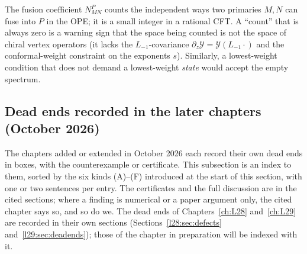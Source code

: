 \begin{physics}
The fusion coefficient $N^P_{MN}$ counts the independent ways two primaries $M,N$ can fuse into $P$
in the OPE; it is a small integer in a rational CFT. A ``count'' that is always zero is a warning
sign that the space being counted is not the space of chiral vertex operators (it lacks the
$L_{-1}$-covariance $\partial_z\mathcal Y=\mathcal Y(L_{-1}\cdot)$ and the conformal-weight constraint on
the exponents $s$). Similarly, a lowest-weight condition that does not demand a lowest-weight
\emph{state} would accept the empty spectrum.
\end{physics}

\subsection{Dead ends recorded in the later chapters (October 2026)}\label{ch15:sec:deadends-oct}

The chapters added or extended in October 2026 each record their own dead ends in  boxes, with the
counterexample or certificate. This subsection is an index to them, sorted by the six kinds (A)--(F) introduced at the
start of this section, with one or two sentences per entry. The certificates and the full discussion are in the cited
sections; where a finding is numerical or a paper argument only, the cited chapter says so, and so do we. The dead
ends of Chapters~\ref{ch:L28} and~\ref{ch:L29} are recorded in their own sections
(Sections~\ref{l28:sec:defects} and~\ref{l29:sec:deadends}); those of the chapter in preparation will be indexed with it.

